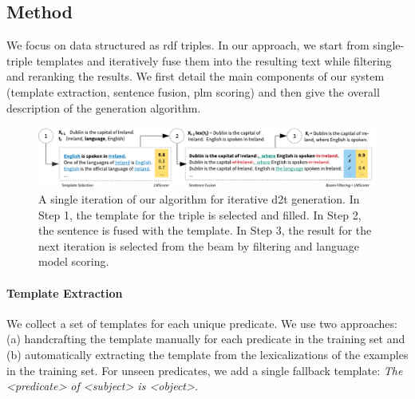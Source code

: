 


\subsection{Method}
\label{sec:text-editing-exp}
We focus on data structured as \ac{rdf} triples. In our approach, we start from single-triple templates and iteratively fuse them into the resulting text while filtering and reranking the results. We first detail the main components of our system (template extraction, sentence fusion, \ac{plm} scoring) and then give the overall description of the generation algorithm.

\begin{figure}[t]
    \centering
    \includegraphics[width=\textwidth]{img/d2t_text_editing}
    \caption{A single iteration of our algorithm for iterative \ac{d2t} generation. In Step 1, the template for the triple is selected and filled. In Step 2, the sentence is fused with the template. In Step 3, the result for the next iteration is selected from the beam by filtering and language model scoring.}\label{fig:iterative:alg}
\end{figure}



\paragraph{Template Extraction}
We collect a set of templates for each unique predicate. We use two approaches: (a) handcrafting the template manually for each predicate in the training set and (b) automatically extracting the template from the lexicalizations of the examples in the training set. For unseen predicates, we add a single fallback template: \textit{The <predicate> of <subject> is <object>.}


